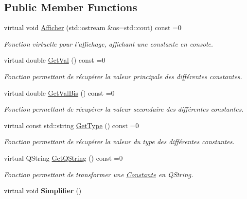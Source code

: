 \subsection*{Public Member Functions}
\begin{DoxyCompactItemize}
\item 
virtual void \hyperlink{class_constante_af3be055efee6c5be81ed6a610dbe2082}{Afficher} (std\-::ostream \&os=std\-::cout) const =0
\begin{DoxyCompactList}\small\item\em Fonction virtuelle pour l'affichage, affichant une constante en console. \end{DoxyCompactList}\item 
virtual double \hyperlink{class_constante_af88eb444ed659cc6bb2f9571326a9eb1}{Get\-Val} () const =0
\begin{DoxyCompactList}\small\item\em Fonction permettant de récupérer la valeur principale des différentes constantes. \end{DoxyCompactList}\item 
virtual double \hyperlink{class_constante_aa0602d62c04f28f7bda68723f5dbc48b}{Get\-Val\-Bis} () const =0
\begin{DoxyCompactList}\small\item\em Fonction permettant de récupérer la valeur secondaire des différentes constantes. \end{DoxyCompactList}\item 
virtual const std\-::string \hyperlink{class_constante_a2f716a85b9b519b7bbf8ed8d997f66d3}{Get\-Type} () const =0
\begin{DoxyCompactList}\small\item\em Fonction permettant de récupérer la valeur du type des différentes constantes. \end{DoxyCompactList}\item 
virtual Q\-String \hyperlink{class_constante_a7c3edb9082492c95eb319da3d42bb7a4}{Get\-Q\-String} () const =0
\begin{DoxyCompactList}\small\item\em Fonction permettant de transformer une \hyperlink{class_constante}{Constante} en Q\-String. \end{DoxyCompactList}\item 
\hypertarget{class_constante_a19f83499c795b8fc069eb18600d4150b}{virtual void {\bfseries Simplifier} ()}\label{class_constante_a19f83499c795b8fc069eb18600d4150b}


\end{DoxyCompactItemize}
